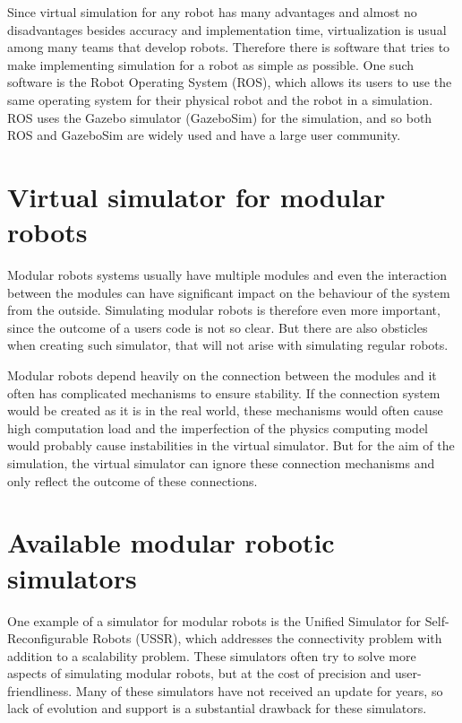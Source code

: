 \documentclass[
  digital, %
  table,   %
  oneside, %
  nolof,     %
  nolot,     %
]{fithesis3}
\begin{document}
Since virtual simulation for any robot has many advantages and almost no disadvantages besides accuracy and implementation time, virtualization is usual among many teams that develop robots.
Therefore there is software that tries to make implementing simulation for a robot as simple as possible.
One such software is the Robot Operating System (ROS), which allows its users to use the same operating system for their physical robot and the robot in a simulation.
ROS uses the Gazebo simulator (GazeboSim) for the simulation, and so both ROS and GazeboSim are widely used and have a large user community.

\section{Virtual simulator for modular robots}

Modular robots systems usually have multiple modules and even the interaction between the modules can have significant impact on the behaviour of the system from the outside.
Simulating modular robots is therefore even more important, since the outcome of a users code is not so clear.
But there are also obsticles when creating such simulator, that will not arise with simulating regular robots.

Modular robots depend heavily on the connection between the modules and it often has complicated mechanisms to ensure stability.
If the connection system would be created as it is in the real world, these mechanisms would often cause high computation load and the imperfection of the physics computing model would probably cause instabilities in the virtual simulator.
But for the aim of the simulation, the virtual simulator can ignore these connection mechanisms and only reflect the outcome of these connections.

\section{Available modular robotic simulators}

One example of a simulator for modular robots is the Unified Simulator for Self-Reconfigurable Robots (USSR)\cite{ussr}, which addresses
the connectivity problem with addition to a scalability problem.
These simulators often try to solve more aspects of simulating modular robots, but at the cost of precision and user-friendliness.
Many of these simulators have not received an update for years, so lack of evolution and support is a substantial drawback for these simulators.
\end{document}
